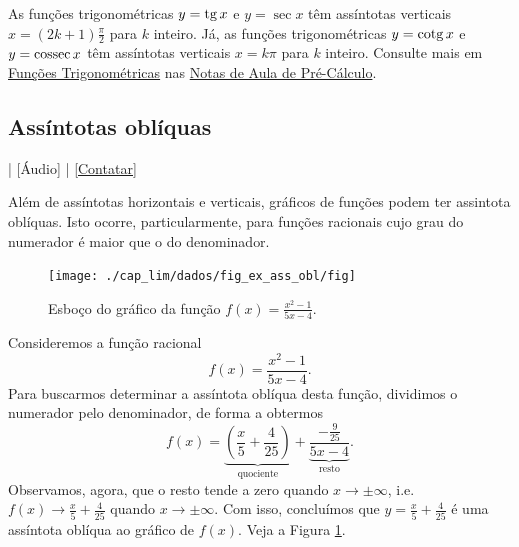 \begin{ex}
  As funções trigonométricas $y = \operatorname{tg} x$ e $y = \sec x$ têm assíntotas verticais $x = (2k+1)\frac{\pi}{2}$ para $k$ inteiro. Já, as funções trigonométricas $y = \operatorname{cotg} x$ e $y = \operatorname{cossec} x$ têm assíntotas verticais $x = k\pi$ para $k$ inteiro. Consulte mais em \href{https://notaspedrok.com.br/notas/PreCalculo/cap_funcao_sec_funtri.html}{Funções Trigonométricas} nas \href{https://notaspedrok.com.br/notas/PreCalculo/main.html}{Notas de Aula de Pré-Cálculo}.
\end{ex}

\subsection{Assíntotas oblíquas}

\begin{flushright}
  [Vídeo] | [Áudio] | \href{https://phkonzen.github.io/notas/contato.html}{[Contatar]}
\end{flushright}

Além de assíntotas horizontais e verticais, gráficos de funções podem ter assintota oblíquas. Isto ocorre, particularmente, para funções racionais cujo grau do numerador é maior que o do denominador.

\begin{figure}[H]
  \centering
  \texttt{[image: ./cap\_lim/dados/fig\_ex\_ass\_obl/fig]}
  \caption{Esboço do gráfico da função $\displaystyle f(x) = \frac{x^2-1}{5x-4}$.}
  \label{fig:ex_ass_obl}
\end{figure}


\begin{ex}
  Consideremos a função racional
  \begin{equation}
    f(x) = \frac{x^2-1}{5x-4}.
  \end{equation}
  Para buscarmos determinar a assíntota oblíqua desta função, dividimos o numerador pelo denominador, de forma a obtermos
  \begin{equation}
    f(x) = \underbrace{\left(\frac{x}{5}+\frac{4}{25}\right)}_{\text{quociente}} + \underbrace{\frac{-\frac{9}{25}}{5x-4}}_{\text{resto}}.
  \end{equation}
  Observamos, agora, que o resto tende a zero quando $x\to\pm\infty$, i.e. $\displaystyle f(x)\to \frac{x}{5}+\frac{4}{25}$ quando $x\to\pm\infty$. Com isso, concluímos que $\displaystyle y = \frac{x}{5}+\frac{4}{25}$ é uma assíntota oblíqua ao gráfico de $f(x)$. Veja a Figura \ref{fig:ex_ass_obl}.
\end{ex}

